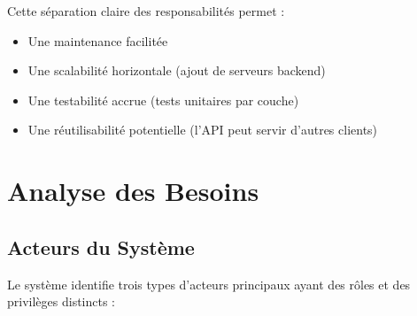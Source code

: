 \documentclass[12pt,a4paper]{report}
\begin{document}
Cette séparation claire des responsabilités permet :
\begin{itemize}
    \item Une maintenance facilitée
    \item Une scalabilité horizontale (ajout de serveurs backend)
    \item Une testabilité accrue (tests unitaires par couche)
    \item Une réutilisabilité potentielle (l'API peut servir d'autres clients)
\end{itemize}

\section{Analyse des Besoins}

\subsection{Acteurs du Système}

Le système identifie trois types d'acteurs principaux ayant des rôles et des privilèges distincts :
\end{document}
